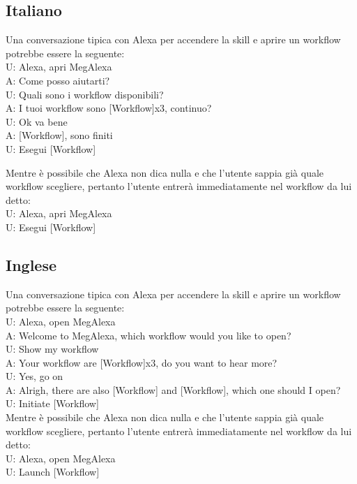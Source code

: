 \subsection{Italiano}
Una conversazione tipica con Alexa per accendere la skill e aprire un workflow potrebbe essere la seguente:\\
\newline
U: Alexa, apri MegAlexa \\
A: Come posso aiutarti? \\
U: Quali sono i workflow disponibili? \\
A: I tuoi workflow sono [Workflow]x3, continuo? \\
U: Ok va bene \\
A: [Workflow], sono finiti \\
U: Esegui [Workflow]

Mentre è possibile che Alexa non dica nulla e che l'utente sappia già quale workflow scegliere, pertanto l'utente entrerà immediatamente nel workflow da lui detto: \\
\newline
U: Alexa, apri MegAlexa\\
U: Esegui [Workflow]

\subsection{Inglese}
Una conversazione tipica con Alexa per accendere la skill e aprire un workflow potrebbe essere la seguente:\\
\newline
U: Alexa, open MegAlexa \\
A: Welcome to MegAlexa, which workflow would you like to open?\\
U: Show my workflow\\
A: Your workflow are [Workflow]x3, do you want to hear more?\\
U: Yes, go on\\
A: Alrigh, there are also [Workflow] and [Workflow], which one should I open?\\
U: Initiate [Workflow] \\

Mentre è possibile che Alexa non dica nulla e che l'utente sappia già quale workflow scegliere, pertanto l'utente entrerà immediatamente nel workflow da lui detto: \\
\newline
U: Alexa, open MegAlexa\\
U: Launch [Workflow]

